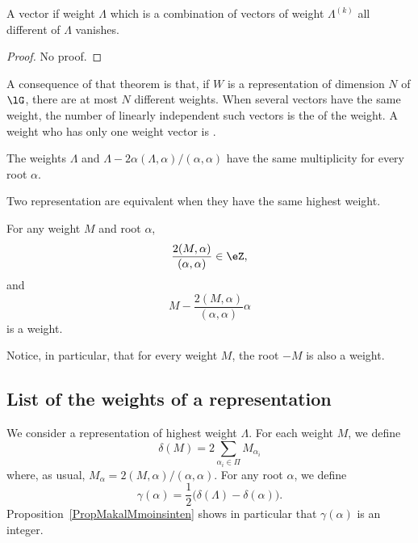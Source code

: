 \begin{theorem}
    A vector if weight $\Lambda$ which is a combination of vectors of weight $\Lambda^{(k)}$ all different of $\Lambda$ vanishes.
\end{theorem}
\begin{proof}
    No proof.
\end{proof}
A consequence of that theorem is that, if $W$ is a representation of dimension $N$ of $\lG$, there are at most $N$ different weights. When several vectors have the same weight, the number of linearly independent such vectors is the  of the weight. A weight who has only one weight vector is .

\begin{proposition}
    The weights $\Lambda$ and $\Lambda-2\alpha(\Lambda,\alpha)/(\alpha,\alpha)$ have the same multiplicity for every root $\alpha$.
\end{proposition}

\begin{theorem}
    Two representation are equivalent when they have the same highest weight.
\end{theorem}

\begin{proposition}     \label{PropMakalMmoinsinten}
For any weight $M$ and root $\alpha$,
\begin{equation}
    \frac{ 2(M,\alpha) }{ (\alpha,\alpha) }\in\eZ,
\end{equation}
and
\begin{equation}
    M-\frac{ 2(M,\alpha) }{ (\alpha,\alpha) }\alpha
\end{equation}
is a weight.
\end{proposition}
Notice, in particular,  that for every weight $M$, the root $-M$ is also a weight.

                    \subsection{List of the weights of a representation}

We consider a representation of highest weight $\Lambda$. For each weight $M$, we define
\begin{equation}
    \delta(M)=2\sum_{\alpha_i\in\Pi}M_{\alpha_i}
\end{equation}
where, as usual, $M_{\alpha}=2(M,\alpha)/(\alpha,\alpha)$. For any root $\alpha$, we define
\begin{equation}
    \gamma(\alpha)=\frac{ 1 }{2}\big( \delta(\Lambda)-\delta(\alpha) \big).
\end{equation}
Proposition~\ref{PropMakalMmoinsinten} shows in particular that $\gamma(\alpha)$ is an integer.

